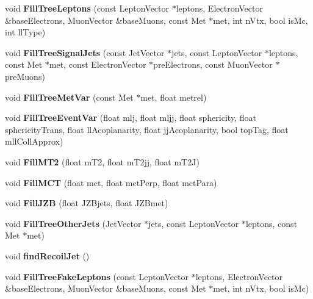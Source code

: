 \begin{DoxyCompactItemize}
\item 
\hypertarget{classToyNt_a2de45d19177c47a717f71ecf064d1571}{
void {\bfseries FillTreeLeptons} (const LeptonVector $\ast$leptons, ElectronVector \&baseElectrons, MuonVector \&baseMuons, const Met $\ast$met, int nVtx, bool isMc, int llType)}
\label{classToyNt_a2de45d19177c47a717f71ecf064d1571}

\item 
\hypertarget{classToyNt_aa3966cddb1d0abf0d22e56e9610cf2fa}{
void {\bfseries FillTreeSignalJets} (const JetVector $\ast$jets, const LeptonVector $\ast$leptons, const Met $\ast$met, const ElectronVector $\ast$preElectrons, const MuonVector $\ast$preMuons)}
\label{classToyNt_aa3966cddb1d0abf0d22e56e9610cf2fa}

\item 
\hypertarget{classToyNt_a7e9d50056c5d3826b69272e24a94b015}{
void {\bfseries FillTreeMetVar} (const Met $\ast$met, float metrel)}
\label{classToyNt_a7e9d50056c5d3826b69272e24a94b015}

\item 
\hypertarget{classToyNt_ac05e4e456c358ef4492d7d2597a5856d}{
void {\bfseries FillTreeEventVar} (float mlj, float mljj, float sphericity, float sphericityTrans, float llAcoplanarity, float jjAcoplanarity, bool topTag, float mllCollApprox)}
\label{classToyNt_ac05e4e456c358ef4492d7d2597a5856d}

\item 
\hypertarget{classToyNt_a7983dd33fbd375004e76ef9fb2eb58bc}{
void {\bfseries FillMT2} (float mT2, float mT2jj, float mT2J)}
\label{classToyNt_a7983dd33fbd375004e76ef9fb2eb58bc}

\item 
\hypertarget{classToyNt_ac11708b58e968f49d1da2c5131c805cf}{
void {\bfseries FillMCT} (float mct, float mctPerp, float mctPara)}
\label{classToyNt_ac11708b58e968f49d1da2c5131c805cf}

\item 
\hypertarget{classToyNt_a7230d72a678204257dbd8ff3ab7b4429}{
void {\bfseries FillJZB} (float JZBjets, float JZBmet)}
\label{classToyNt_a7230d72a678204257dbd8ff3ab7b4429}

\item 
\hypertarget{classToyNt_a64e7b0fed4fa2faac2b08d5b845019e5}{
void {\bfseries FillTreeOtherJets} (JetVector $\ast$jets, const LeptonVector $\ast$leptons, const Met $\ast$met)}
\label{classToyNt_a64e7b0fed4fa2faac2b08d5b845019e5}

\item 
\hypertarget{classToyNt_a0b5165d43202460ac67b799aa05ba9fb}{
void {\bfseries findRecoilJet} ()}
\label{classToyNt_a0b5165d43202460ac67b799aa05ba9fb}

\item 
\hypertarget{classToyNt_a52ed26212ca64ba2d16883fb91a0a90e}{
void {\bfseries FillTreeFakeLeptons} (const LeptonVector $\ast$leptons, ElectronVector \&baseElectrons, MuonVector \&baseMuons, const Met $\ast$met, int nVtx, bool isMc)}
\label{classToyNt_a52ed26212ca64ba2d16883fb91a0a90e}

\end{DoxyCompactItemize}
